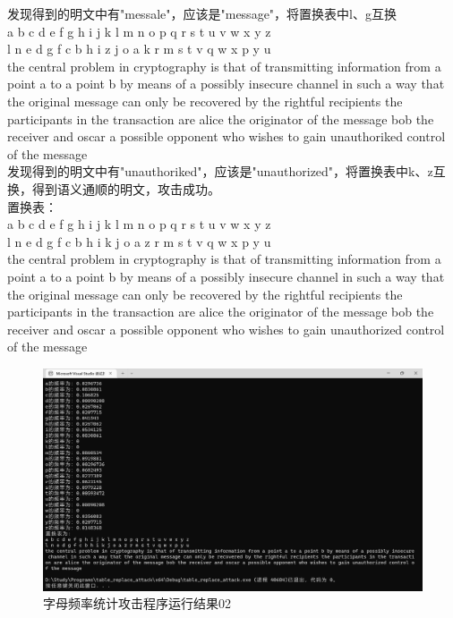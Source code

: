 	发现得到的明文中有"messale"，应该是"message"，将置换表中l、g互换\\
	a b c d e f g h i j k l m n o p q r s t u v w x y z\\
	l n e d g f c b h i z j o a k r m s t v q w x p y u\\
	the central problem in cryptography is that of transmitting information from a point a to a point b by means of a possibly insecure channel in such a way that the original message can only be recovered by the rightful recipients the participants in the transaction are alice the originator of the message bob the receiver and oscar a possible opponent who wishes to gain unauthoriked control of the message\\
	
	发现得到的明文中有"unauthoriked"，应该是"unauthorized"，将置换表中k、z互换，得到语义通顺的明文，攻击成功。\\
	置换表：\\
	a b c d e f g h i j k l m n o p q r s t u v w x y z\\
	l n e d g f c b h i k j o a z r m s t v q w x p y u\\
	the central problem in cryptography is that of transmitting information from a point a to a point b by means of a possibly insecure channel in such a way that the original message can only be recovered by the rightful recipients the participants in the transaction are alice the originator of the message bob the receiver and oscar a possible opponent who wishes to gain unauthorized control of the message\\



\begin{figure}[H]
	\centering
	\includegraphics[width=16cm]{figure/005.png}
	\caption{字母频率统计攻击程序运行结果02}
	\label{fig:字母频率统计攻击程序运行结果02}
\end{figure}




